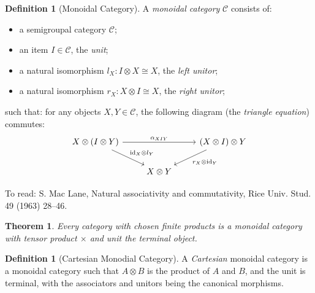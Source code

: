 \documentclass{book}
\newtheorem{thm}[lm]{Theorem}
\theoremstyle{definition}
\newtheorem{df}[lm]{Definition}
\newcommand{\id}[1]{\ensuremath{\mathrm{id}_{#1}}}
\begin{document}
  \begin{df}[Monoidal Category]
    A \emph{monoidal category} $\mathcal{C}$ consists of:
    \begin{itemize}
      \item a semigroupal category $\mathcal{C}$;
      \item an item $I \in \mathcal{C}$, the \emph{unit};
      \item a natural isomorphism $l_X : I \otimes X \cong X$, the \emph{left 
        unitor};
      \item a natural isomorphism $r_X : X \otimes I \cong X$, the \emph{right 
        unitor};
    \end{itemize}
    such that:
    for any objects $X, Y \in \mathcal{C}$, the following diagram (the 
    \emph{triangle equation}) commutes:
    \[ \begin{tikzcd}
      X \otimes (I \otimes Y) \ar[rr, "\alpha_{XIY}"] \ar[dr, "\id{X} \otimes 
      l_Y"] 
      & & (X \otimes I) \otimes Y \ar[dl, "r_X \otimes \id{Y}"] \\
      & X \otimes Y
    \end{tikzcd} \]
  \end{df}
  
  To read: S. Mac Lane, Natural associativity and commutativity, Rice Univ. 
  Stud. 
  49 (1963) 28–46.
  
  \begin{thm}
    Every category with chosen finite products is a monoidal category with 
    tensor 
    product $\times$ and unit the terminal object.
  \end{thm}
  
  \begin{df}[Cartesian Monodial Category]
    A \emph{Cartesian} monoidal category is a monoidal category such that $A 
    \otimes B$ is the product of $A$ and $B$, and the unit is terminal, with 
    the 
    associators and unitors being the canonical morphisms.
  \end{df}
  
\end{document}
